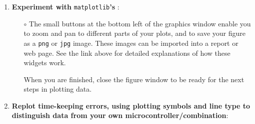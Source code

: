 \begin{enumerate}
	\item \textbf{Experiment with} \lstinline{matplotlib}\textbf{'s} :
	\begin{itemize}
		\item[$\circ$] The small buttons at the bottom left of the graphics window enable you to zoom and pan to different parts of your plots, and to save your figure as a \lstinline{png} or \lstinline{jpg} image.
		These images can be imported into a report or web page. 
		See the link above for detailed explanations of how these widgets work.  
		
		\smallskip
		When you are finished, close the figure window to be ready for the next steps in plotting data.
	\end{itemize}

	\item \textbf{Replot time-keeping errors, using plotting symbols and line type to distinguish data from your own microcontroller/\rtc combination}:


\end{enumerate}
